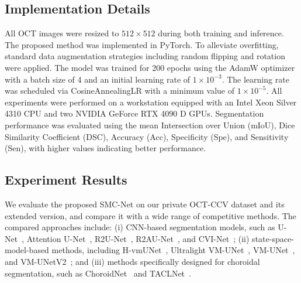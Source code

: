 \documentclass[lettersize,journal]{IEEEtran}
\begin{document}
\subsection{Implementation Details}
All OCT images were resized to $512\times512$ during both training and inference.
The proposed method was implemented in PyTorch.
To alleviate overfitting, standard data augmentation strategies including random flipping and rotation were applied.
The model was trained for 200 epochs using the AdamW optimizer with a batch size of 4 and an initial learning rate of $1\times10^{-3}$.
The learning rate was scheduled via CosineAnnealingLR with a minimum value of $1\times10^{-5}$.
All experiments were performed on a workstation equipped with an Intel Xeon Silver 4310 CPU and two NVIDIA GeForce RTX 4090 D GPUs.
Segmentation performance was evaluated using the mean Intersection over Union (mIoU), Dice Similarity Coefficient (DSC), Accuracy (Acc), Specificity (Spe), and Sensitivity (Sen), with higher values indicating better performance.

\subsection{Experiment Results}
We evaluate the proposed SMC-Net on our private OCT-CCV dataset and its extended version, and compare it with a wide range of competitive methods.
The compared approaches include:
(i) CNN-based segmentation models, such as U-Net~\cite{ronneberger2015u}, Attention U-Net~\cite{Oktay2018AttentionUNet}, R2U-Net~\cite{alom2018recurrentresidualconvolutionalneural}, R2AU-Net~\cite{R2AU-Net}, and CVI-Net~\cite{cvinet};
(ii) state-space-model-based methods, including H-vmUNet~\cite{wu2024hvmunethighordervisionmamba}, Ultralight VM-UNet~\cite{wu2024ultralightvmunetparallelvision}, VM-UNet~\cite{vmunet}, and VM-UNetV2~\cite{vmunetv2};
and (iii) methods specifically designed for choroidal segmentation, such as ChoroidNet~\cite{choroidnet} and TACLNet~\cite{wen2024}.
\end{document}
